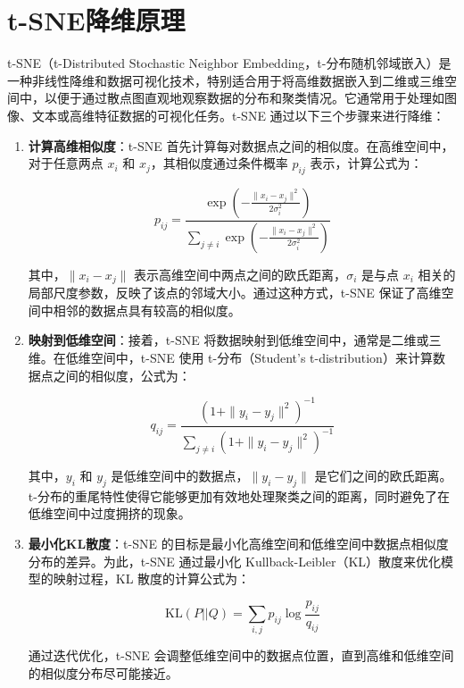 \documentclass[master]{thesis-uestc}
\begin{document}
\section{t-SNE降维原理}
t-SNE（t-Distributed Stochastic Neighbor Embedding，t-分布随机邻域嵌入）是一种非线性降维和数据可视化技术，特别适合用于将高维数据嵌入到二维或三维空间中，以便于通过散点图直观地观察数据的分布和聚类情况。它通常用于处理如图像、文本或高维特征数据的可视化任务。t-SNE 通过以下三个步骤来进行降维：

\begin{enumerate}[label={(\arabic*)}]
    \item \textbf{计算高维相似度}：t-SNE 首先计算每对数据点之间的相似度。在高维空间中，对于任意两点 \(x_i\) 和 \(x_j\)，其相似度通过条件概率 \(p_{ij}\) 表示，计算公式为：
    
    \begin{equation}
    p_{ij} = \frac{\exp\left( -\frac{\|x_i - x_j\|^2}{2\sigma_i^2} \right)}{\sum_{j \neq i} \exp\left( -\frac{\|x_i - x_j\|^2}{2\sigma_i^2} \right)}
    \end{equation}
    
    其中，\(\|x_i - x_j\|\) 表示高维空间中两点之间的欧氏距离，\(\sigma_i\) 是与点 \(x_i\) 相关的局部尺度参数，反映了该点的邻域大小。通过这种方式，t-SNE 保证了高维空间中相邻的数据点具有较高的相似度。
    
    \item \textbf{映射到低维空间}：接着，t-SNE 将数据映射到低维空间中，通常是二维或三维。在低维空间中，t-SNE 使用 t-分布（Student's t-distribution）来计算数据点之间的相似度，公式为：
    
    \begin{equation}
    q_{ij} = \frac{\left( 1 + \|y_i - y_j\|^2 \right)^{-1}}{\sum_{j \neq i} \left( 1 + \|y_i - y_j\|^2 \right)^{-1}}
    \end{equation}
    
    其中，\(y_i\) 和 \(y_j\) 是低维空间中的数据点，\(\|y_i - y_j\|\) 是它们之间的欧氏距离。t-分布的重尾特性使得它能够更加有效地处理聚类之间的距离，同时避免了在低维空间中过度拥挤的现象。
    
    \item \textbf{最小化KL散度}：t-SNE 的目标是最小化高维空间和低维空间中数据点相似度分布的差异。为此，t-SNE 通过最小化 Kullback-Leibler（KL）散度来优化模型的映射过程，KL 散度的计算公式为：
    
    \begin{equation}
    \text{KL}(P || Q) = \sum_{i,j} p_{ij} \log \frac{p_{ij}}{q_{ij}}
    \end{equation}
    
    通过迭代优化，t-SNE 会调整低维空间中的数据点位置，直到高维和低维空间的相似度分布尽可能接近。
\end{enumerate}
\end{document}
